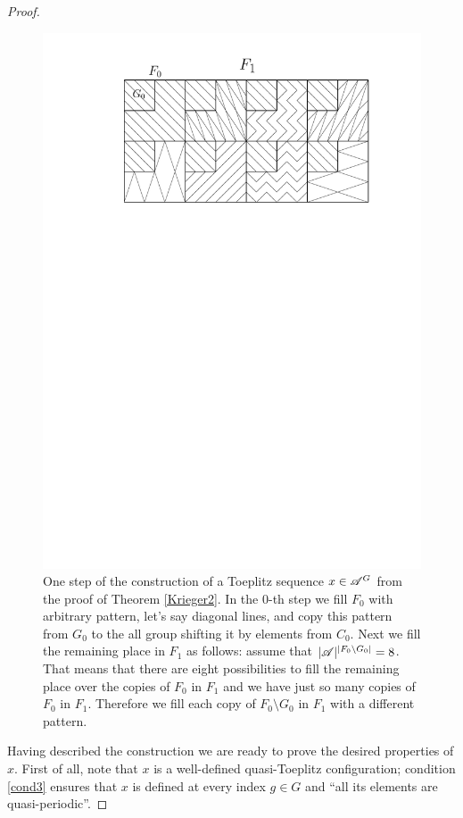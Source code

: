 \begin{proof}
\begin{figure}
\centering
\includegraphics[scale=1]{Graphics/krieger_construct}
\caption{One step of the construction of a Toeplitz sequence $x\in\mathscr{A}^G$  from the proof of Theorem \ref{Krieger2}. In the $0$-th step we fill $F_0$ with arbitrary pattern, let's say diagonal lines, and copy this pattern from $G_0$ to the all group shifting it by elements from $C_0$. Next we fill the remaining place in $F_1$ as follows: assume that $|\mathscr{A}|^{|F_0\setminus G_0|}=8$. That means that there are eight possibilities to fill the remaining place over the copies of $F_0$ in $F_1$ and we have just so many copies of $F_0$ in $F_1$. Therefore we fill each copy of $F_0\setminus G_0$ in $F_1$ with a different pattern.}\label{fig:krieger_construction}
\end{figure}

Having described the construction we are ready to prove the desired properties of $x$.
%
First of all, note that $x$ is a well-defined quasi-Toeplitz configuration; condition \ref{cond3} ensures that $x$ is defined at every index $g\in G$ and ``all its elements are quasi-periodic''.


\end{proof}
